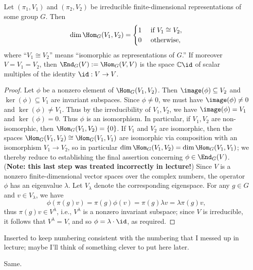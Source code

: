 \documentclass[reqno]{amsart} 
\begin{document}
\begin{theorem}
  Let $(\pi_1, V_1)$ and $(\pi_2, V_2)$ be irreducible finite-dimensional representations of some group $G$.  Then
  \begin{equation}\label{eq:}
    \dim \Hom_G (V_1, V_2) = 
\begin{cases}
      1 & \text{ if } V_1 \cong V_2, \\
      0 & \text{ otherwise},
    \end{cases}
  \end{equation}
  where ``$V_1 \cong V_2$'' means ``isomorphic as representations of $G$.''  If moreover $V = V_1 = V_2$, then $\End_G(V) := \Hom_G(V,V)$ is the space $\mathbb{C} \id$ of scalar multiples of the identity $\id : V \rightarrow V$.
\end{theorem}
\begin{proof}
  Let $\phi$ be a nonzero element of $\Hom_G(V_1,V_2)$.  Then $\image(\phi) \subseteq V_2$ and $\ker(\phi) \subseteq V_1$ are invariant subspaces.  Since $\phi \neq 0$, we must have $\image(\phi) \neq 0$ and $\ker(\phi) \neq V_1$.  Thus by the irreducibility of $V_1, V_2$, we have $\image(\phi) = V_1$ and $\ker(\phi) = 0$.  Thus $\phi$ is an isomorphism.  In particular, if $V_1, V_2$ are non-isomorphic, then $\Hom_G(V_1,V_2) = \{0\}$.  If $V_1$ and $V_2$ are isomorphic, then the spaces $\Hom_G (V_1, V_2) \cong \Hom_G(V_1,V_1)$ are isomorphic via composition with an isomorphism $V_1 \rightarrow V_2$, so in particular $\dim \Hom_G (V_1, V_2) = \dim \Hom_G(V_1,V_1)$; we thereby reduce to establishing the final assertion concerning $\phi \in \End_G(V)$.  ({\bf Note: this last step was treated incorrectly in lecture!})  Since $V$ is a nonzero finite-dimensional vector spaces over the complex numbers, the operator $\phi$ has an eigenvalue $\lambda$.  Let $V_\lambda$ denote the corresponding eigenspace.  For any $g \in G$ and $v \in V_\lambda$, we have
  \begin{equation}
    \phi(\pi(g) v)
    =
    \pi(g) \phi(v)
    = \pi(g) \lambda v
    = \lambda \pi(g) v,
  \end{equation}
  thus $\pi(g) v \in V^\lambda$, i.e., $V^\lambda$ is a nonzero invariant subspace; since $V$ is irreducible, it follows that $V^\lambda = V$, and so $\phi = \lambda \cdot \id$, as required.
\end{proof}

\begin{remark}
  Inserted to keep numbering consistent with the numbering that I messed up in lecture; maybe I'll think of something clever to put here later.
\end{remark}
\begin{remark}
  Same.
\end{remark}
\end{document}
